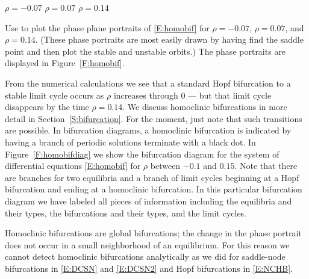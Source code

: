 \documentclass{ximera}
\begin{document}
\begin{figure*}[htb]
           \centerline{%
           }
		\vspace*{-0.2in}		
	$\rho=-0.07$ \hspace{1.8in} $\rho=0.07$ 
		\hspace{1.8in} $\rho=0.14$
	  \caption{Phase planes for the differential equation 
	\protect\eqref{E:homobif}. }
           \label{F:homobif}
\end{figure*}

Use {\pplane} to plot the phase plane portraits of \eqref{E:homobif}
for $\rho=-0.07$, $\rho=0.07$, and $\rho=0.14$.  (These phase portraits 
are most easily drawn by having {\pplane} find the saddle point and
then plot the stable and unstable orbits.)  The phase portraits are 
displayed in Figure~\ref{F:homobif}.  

From the numerical calculations we see that a standard Hopf bifurcation 
to a stable limit cycle occurs as $\rho$ 
increases through $0$ --- but that limit cycle disappears by the
time $\rho=0.14$.   We discuss homoclinic bifurcations in more detail 
in Section~\ref{S:bifurcation}.  For the moment, just note that such 
transitions are possible.  In bifurcation diagrams, a homoclinic 
bifurcation  is indicated by having a branch of periodic solutions
terminate with a black dot.  In Figure~\ref{F:homobifdiag} we show the 
bifurcation diagram for the system of differential equations 
\eqref{E:homobif} for $\rho$ between $-0.1$ and $0.15$.  Note that there
are branches for two equilibria and a 
branch of limit cycles 
beginning at a Hopf bifurcation and ending at a homoclinic bifurcation.
In this particular bifurcation diagram we have labeled all pieces
of information including the equilibria and their types, the 
bifurcations and their types, and the limit cycles.


\begin{figure*}[htb]
           \centerline{%
           }
  \caption{Schematic bifurcation diagram for the differential equation
    \protect\eqref{E:homobif} indicating a branch of stable limit cycles
        ending in a homoclinic bifurcation.}
           \label{F:homobifdiag}
\end{figure*}

Homoclinic bifurcations are global bifurcations; the change in the phase 
portrait does not occur in a small neighborhood of an equilibrium.  For 
this reason we cannot detect homoclinic bifurcations analytically as we 
did for saddle-node bifurcations in \eqref{E:DCSN} and \eqref{E:DCSN2} and Hopf bifurcations in \eqref{E:NCHB}.
\end{document}
